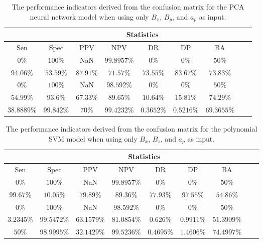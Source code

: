 \begin{table}[!ht]
	\centering
	\begin{tabular}{|c|c|c|c|c|c|c|c|c|}
		\hline
		 & \multicolumn{7}{c|}{Statistics} \\ \hline
		Sen & Spec & PPV & NPV & DR & DP & BA \\ \hline
		$0\%$ & $100\%$ & NaN & $99.8957\%$ & $0\%$ & $0\%$ & $50\%$ \\ \hline
		$94.06\%$ & $53.59\%$ & $87.91\%$ & $71.57\%$ & $73.55\%$ & $83.67\%$ & $73.83\%$ \\ \hline
		$0\%$ & $100\%$ & NaN & $98.592\%$ & $0\%$ & $0\%$ & $50\%$ \\ \hline
		$54.99\%$ & $93.6\%$ & $67.33\%$ & $89.65\%$ & $10.64\%$ & $15.81\%$ & $74.29\%$ \\ \hline
		$38.8889\%$ & $99.842\%$ & $70\%$ & $99.4232\%$ & $0.3652\%$ & $0.5216\%$ & $69.3655\%$ \\ \hline
	\end{tabular}
	\caption{The performance indicators derived from the confusion matrix for the PCA neural network model when using only $B_{x}$, $B_{y}$, and $a_{p}$ as input.}
	\label{tab:cs:xyap:pcaNNet}
\end{table}

\begin{table}[!ht]
	\centering
	\begin{tabular}{|c|c|c|c|c|c|c|c|c|}
		\hline
		 & \multicolumn{7}{c|}{Statistics} \\ \hline
		Sen & Spec & PPV & NPV & DR & DP & BA \\ \hline
		$0\%$ & $100\%$ & NaN & $99.8957\%$ & $0\%$ & $0\%$ & $50\%$ \\ \hline
		$99.67\%$ & $10.05\%$ & $79.89\%$ & $89.36\%$ & $77.93\%$ & $97.55\%$ & $54.86\%$ \\ \hline
		$0\%$ & $100\%$ & NaN & $98.592\%$ & $0\%$ & $0\%$ & $50\%$ \\ \hline
		$3.2345\%$ & $99.5472\%$ & $63.1579\%$ & $81.0854\%$ & $0.626\%$ & $0.9911\%$ & $51.3909\%$ \\ \hline
		$50\%$ & $98.9995\%$ & $32.1429\%$ & $99.5236\%$ & $0.4695\%$ & $1.4606\%$ & $74.4997\%$ \\ \hline
	\end{tabular}
	\caption{The performance indicators derived from the confusion matrix for the polynomial SVM model when using only $B_{x}$, $B_{z}$, and $a_{p}$ as input.}
	\label{tab:cs:xzap:svmPoly}
\end{table}

